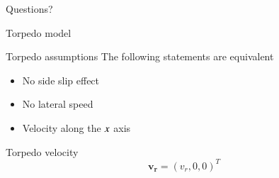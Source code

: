 \documentclass[10pt, xcolor={usenames, dvipsnames}]{beamer}
\begin{document}
       

    \appendix

    \begin{frame}[standout]
        Questions?
    \end{frame}

    \begin{frame}{Torpedo model}
        \centering
        \begin{minipage}{0.7\textwidth}
            \begin{block}{Torpedo assumptions}
                The following statements are equivalent
                \begin{itemize}
                    \item No side slip effect \\
                    \item No lateral speed
                    \item Velocity along the $\mathnormal{x}$ axis \\
                \end{itemize}
            \end{block}
            \begin{block}{Torpedo velocity}
                \begin{equation}
                    \mathbf{v_r} = (v_r, 0, 0)^T
                \end{equation}
            \end{block}
        \end{minipage}
    \end{frame}
\end{document}
